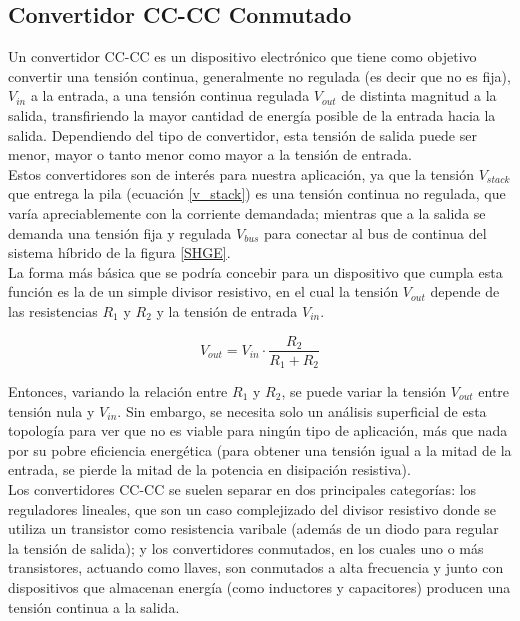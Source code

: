 \subsection{Convertidor CC-CC Conmutado}

Un convertidor CC-CC es un dispositivo electrónico que tiene como objetivo convertir una tensión continua, generalmente no regulada (es decir que no es fija), $V_{in}$ a la entrada, a una tensión continua regulada $V_{out}$ de distinta magnitud a la salida, transfiriendo la mayor cantidad de energía posible de la entrada hacia la salida. Dependiendo del tipo de convertidor, esta tensión de salida puede ser menor, mayor o tanto menor como mayor a la tensión de entrada.\\

Estos convertidores son de interés para nuestra aplicación, ya que la tensión $V_{stack}$ que entrega la pila (ecuación \ref{v_stack}) es una tensión continua no regulada, que varía apreciablemente con la corriente demandada; mientras que a la salida se demanda una tensión fija y regulada $V_{bus}$ para conectar al bus de continua del sistema híbrido de la figura \ref{SHGE}.\\

La forma más básica que se podría concebir para un dispositivo que cumpla esta función es la de un simple divisor resistivo, en el cual la tensión $V_{out}$ depende de las resistencias $R_1$ y $R_2$ y la tensión de entrada $V_{in}$.

\begin{equation*}
    V_{out} = V_{in}\cdot\frac{R_2}{R_1+R_2}
\end{equation*}

Entonces, variando la relación entre $R_1$ y $R_2$, se puede variar la tensión $V_{out}$ entre tensión nula y $V_{in}$. Sin embargo, se necesita solo un análisis superficial de esta topología para ver que no es viable para ningún tipo de aplicación, más que nada por su pobre eficiencia energética (para obtener una tensión igual a la mitad de la entrada, se pierde la mitad de la potencia en disipación resistiva).\\

Los convertidores CC-CC se suelen separar en dos principales categorías: los {\Medium reguladores lineales}, que son un caso complejizado del divisor resistivo donde se utiliza un transistor como resistencia varibale (además de un diodo para regular la tensión de salida); y los {\Medium convertidores conmutados}, en los cuales uno o más transistores, actuando como llaves, son conmutados a alta frecuencia y junto con dispositivos que almacenan energía (como inductores y capacitores) producen una tensión continua a la salida.\\

